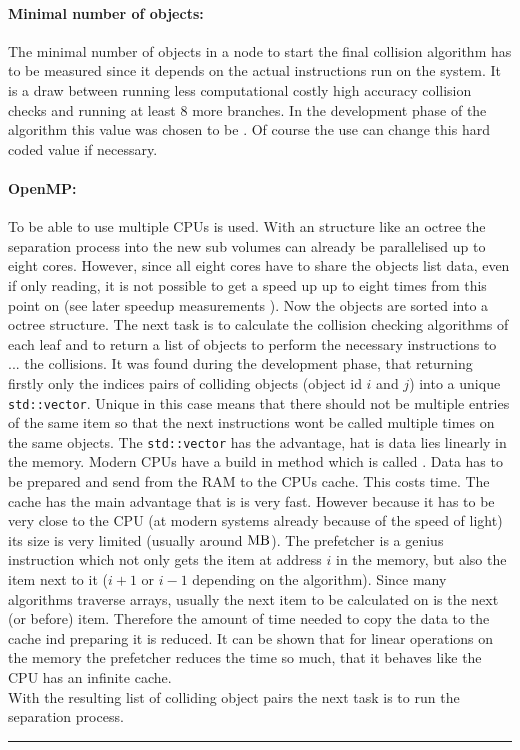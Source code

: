 \paragraph{Minimal number of objects:}
The minimal number of objects in a node to start the final collision algorithm has to be measured since it depends on the actual instructions run on the system.
It is a draw between running less computational costly high accuracy collision checks and running at least 8 more branches.
In the development phase of the algorithm this value was chosen to be \dummy.
Of course the use can change this hard coded value if necessary. 
% 
\paragraph{OpenMP:}
To be able to use multiple \ac{CPU}s \openmp is used. With an structure like an octree the separation process into the new sub volumes can already be parallelised up to eight cores.
However, since all eight cores have to share the objects list data, even if only reading, it is not possible to get a speed up up to eight times from this point on (see later speedup measurements \dummy).
% 
Now the objects are sorted into a octree structure.
The next task is to calculate the collision checking algorithms of each leaf and to return a list of objects to perform the necessary instructions to ... the collisions.
It was found during the development phase, that returning firstly only the indices pairs of colliding objects (\eg object id $i$ and $j$) into a unique \texttt{std::vector}.
Unique in this case means that there should not be multiple entries of the same item so that the next instructions wont be called multiple times on the same objects.
The \texttt{std::vector} has the advantage, hat is data lies linearly in the memory.
Modern \ac{CPU}s have a build in method which is called .
Data has to be prepared and send from the \ac{RAM} to the \ac{CPU}s cache.
This costs time.
The cache has the main advantage that is is very fast.
However because it has to be very close to the \ac{CPU} (at modern systems already because of the speed of light) its size is very limited (usually around $\si{\mega\byte}$).
The prefetcher is a genius instruction which not only gets the item at address $i$ in the memory, but also the item next to it ($i+1$ or $i-1$ depending on the algorithm).
Since many algorithms traverse arrays, usually the next item to be calculated on is the next (or before) item.
Therefore the amount of time needed to copy the data to the cache ind preparing it is reduced.
It can be shown that for linear operations on the memory the prefetcher reduces the time so much, that it behaves like the \ac{CPU} has an infinite cache.
\\[\baselineskip]
% 
With the resulting list of colliding object pairs the next task is to run the separation process.
% 
% 
% 
\vspace{5pt}
\hrule
\vspace{6pt}
% 
\newpage
%

